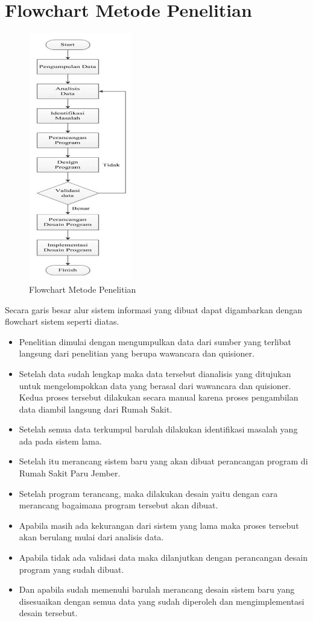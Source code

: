 \documentclass{jtetiproposalskripsi}
\begin{document}
\section{Flowchart Metode Penelitian}
\begin{figure}[ht!]
\centering
\includegraphics[width=0.4\textwidth]{gambar/flowchart}
\caption{Flowchart Metode Penelitian}
\label{wsn}
\end{figure}
\newpage
Secara garis besar alur sistem informasi yang dibuat dapat digambarkan dengan flowchart sistem seperti diatas.
\begin{itemize}

\item	Penelitian dimulai dengan mengumpulkan data dari sumber yang terlibat langsung dari penelitian yang berupa wawancara dan quisioner. 
\item	Setelah data sudah lengkap maka data tersebut dianalisis yang ditujukan untuk mengelompokkan data yang berasal dari wawancara dan quisioner. Kedua proses tersebut dilakukan secara manual karena proses pengambilan data diambil langsung dari Rumah Sakit. 
\item	Setelah semua data terkumpul barulah dilakukan identifikasi masalah yang ada pada sistem lama.
\item	Setelah itu merancang sistem baru yang akan dibuat perancangan program di Rumah Sakit Paru Jember.
\item	Setelah program terancang, maka dilakukan desain yaitu dengan cara merancang bagaimana program tersebut akan dibuat.
\item	Apabila masih ada kekurangan dari sistem yang lama maka proses tersebut akan berulang mulai dari analisis data. 
\item	Apabila tidak ada validasi data maka dilanjutkan dengan perancangan desain program yang sudah dibuat.
\item	Dan apabila sudah memenuhi barulah merancang desain sistem baru yang disesuaikan dengan semua data yang sudah diperoleh dan mengimplementasi desain tersebut.
\end{itemize}
\end{document}
